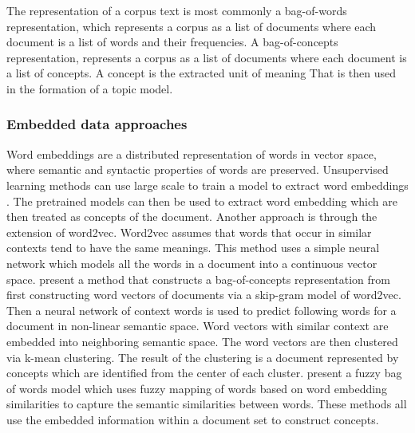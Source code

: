 The representation of a corpus text is most commonly a bag-of-words representation, which represents a corpus as a list of documents where each document is a list of words and their frequencies. A bag-of-concepts representation, represents a corpus as a list of documents where each document is a list of concepts. A concept is the extracted unit of meaning That is then used in the formation of a topic model.

\subsubsection{Embedded data approaches}
Word embeddings are a distributed representation of words in vector space, where semantic and syntactic properties of words are preserved. Unsupervised learning methods can use large scale to train a model to extract word embeddings \citep{mikolov2013efficient,mikolov2013distributed,pennington2014glove}. The pretrained models can then be used to extract word embedding which are then treated as concepts of the document. Another approach is through the extension of word2vec. Word2vec assumes that words that occur in similar contexts tend to have the same meanings. This method uses a simple neural network which models all the words in a document into a continuous vector space. \citet{kim2017bag} present a method that constructs a bag-of-concepts representation from first constructing word vectors of documents via a skip-gram model of word2vec. Then a neural network of context words is used to predict following words for a document in non-linear semantic space. Word vectors with similar context are embedded into neighboring semantic space. The word vectors are then clustered via k-mean clustering. The result of the clustering is a document represented by concepts which are identified from the center of each cluster. \citet{zhao2017fuzzy} present a fuzzy bag of words model which uses fuzzy mapping of words based on word embedding similarities to capture the semantic similarities between words. These methods all use the embedded information within a document set to construct concepts. 

